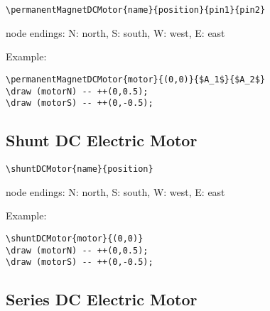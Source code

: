 \documentclass[parskip=full]{scrartcl}
\begin{document}
\begin{verbatim}
\permanentMagnetDCMotor{name}{position}{pin1}{pin2}
\end{verbatim}
node endings: N: north, S: south, W: west, E: east

Example:\\
\begin{minipage}{0.8\textwidth}
\begin{verbatim}
\permanentMagnetDCMotor{motor}{(0,0)}{$A_1$}{$A_2$}
\draw (motorN) -- ++(0,0.5);
\draw (motorS) -- ++(0,-0.5);
\end{verbatim}
\end{minipage}
\begin{minipage}{0.19\textwidth}
\end{minipage}

\subsection{Shunt DC Electric Motor}

\begin{verbatim}
\shuntDCMotor{name}{position}
\end{verbatim}
node endings: N: north, S: south, W: west, E: east

Example:\\
\begin{minipage}{0.8\textwidth}
\begin{verbatim}
\shuntDCMotor{motor}{(0,0)}
\draw (motorN) -- ++(0,0.5);
\draw (motorS) -- ++(0,-0.5);
\end{verbatim}
\end{minipage}
\begin{minipage}{0.19\textwidth}
\end{minipage}

\subsection{Series DC Electric Motor}
\end{document}
